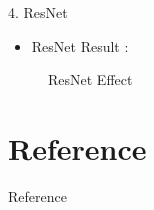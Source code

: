 \documentclass{beamer}
\begin{document}
\begin{frame}{4. ResNet}
	\vspace{10pt}
	\begin{itemize}
		\item ResNet Result :
	\end{itemize}
	\vspace{10pt}
	\begin{figure}[h]		
		\centering
		\quad
		\caption{ResNet Effect}
		\label{effect}
	\end{figure}
\end{frame}


\section{Reference}
\begin{frame}[allowframebreaks]{Reference}
	
\end{frame}
\end{document}
